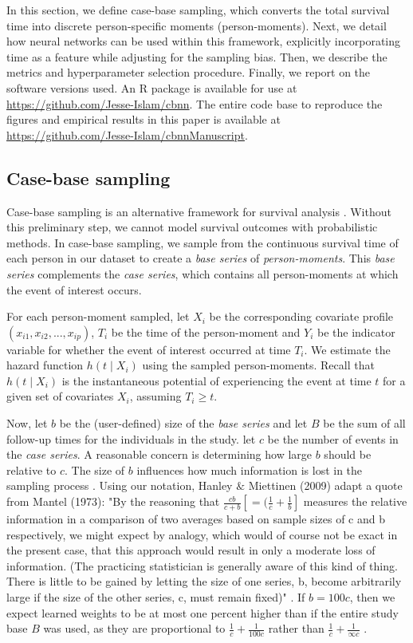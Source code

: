 \documentclass[APA,LATO1COL]{WileyNJD-v2}
\begin{document}
In this section, we define case-base sampling, which converts the total
survival time into discrete person-specific moments (person-moments).
Next, we detail how neural networks can be used within this framework,
explicitly incorporating time as a feature while adjusting for the
sampling bias. Then, we describe the metrics and hyperparameter selection procedure.
Finally, we report on the software versions used. An R
package is available for use at
\url{https://github.com/Jesse-Islam/cbnn}. The entire code base to
reproduce the figures and empirical results in this paper is available
at \url{https://github.com/Jesse-Islam/cbnnManuscript}.

\hypertarget{case-base-sampling}{%
\subsection{Case-base sampling}\label{case-base-sampling}}

Case-base sampling is an alternative framework for survival analysis
\citep{hanley2009}. Without this preliminary step, we cannot model survival
outcomes with probabilistic methods. In case-base sampling, we sample from the continuous
survival time of each person in our dataset to create a \emph{base
series} of \emph{person-moments}. This \emph{base series} complements
the \emph{case series}, which contains all person-moments at which the
event of interest occurs.

For each person-moment sampled, let \(X_i\) be the corresponding
covariate profile \(\left(x_{i1},x_{i2},...,x_{ip} \right)\), \(T_i\) be
the time of the person-moment and \(Y_i\) be the indicator variable for
whether the event of interest occurred at time \(T_i\). We estimate the
hazard function \(h(t \mid X_i)\) using the sampled person-moments.
Recall that \(h(t \mid X_i)\) is the instantaneous potential of
experiencing the event at time \(t\) for a given set of covariates
\(X_i\), assuming \(T_i \geq t\).

Now, let \(b\) be the (user-defined) size of the \emph{base series} and
let \(B\) be the sum of all follow-up times for the individuals in the
study. let $c$ be the number of events in the \emph{case series}.
A reasonable concern is determining how large $b$ should be relative to $c$.
The size of \(b\) influences how much information is lost in the sampling process
\citep{hanley2009}. Using our notation, Hanley $\&$ Miettinen (2009)
adapt a quote from Mantel (1973): "By the reasoning that $\frac{cb}{c+b} [=(\frac{1}{c}+\frac{1}{b}]$
measures the relative information in a comparison of two averages based on
sample sizes of c and b respectively, we might expect by analogy, which would
of course not be exact in the present case, that this approach would result in
only a moderate loss of information. (The practicing statistician is generally
aware of this kind of thing. There is little to be gained by letting the size of
one series, b, become arbitrarily large if the size of the other series, c, must
remain fixed)" \citep{hanley2009} \citep{mantel1}. If $b=100c$, then we expect learned
weights to be at most one percent higher than if the entire study base $B$ was used,
as they are proportional to $\frac{1}{c}+\frac{1}{100c}$ rather than $\frac{1}{c}+\frac{1}{\infty c}$ \citep{hanley2009}.
\end{document}
